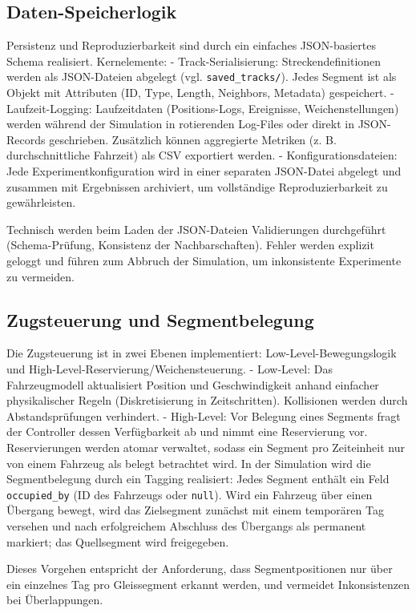\subsection*{Daten-Speicherlogik}
Persistenz und Reproduzierbarkeit sind durch ein einfaches JSON-basiertes Schema realisiert. Kernelemente:
- Track-Serialisierung: Streckendefinitionen werden als JSON-Dateien abgelegt (vgl. \texttt{saved\_tracks/}). Jedes Segment ist als Objekt mit Attributen (ID, Type, Length, Neighbors, Metadata) gespeichert.
- Laufzeit-Logging: Laufzeitdaten (Positions-Logs, Ereignisse, Weichenstellungen) werden während der Simulation in rotierenden Log-Files oder direkt in JSON-Records geschrieben. Zusätzlich können aggregierte Metriken (z. B. durchschnittliche Fahrzeit) als CSV exportiert werden.
- Konfigurationsdateien: Jede Experimentkonfiguration wird in einer separaten JSON-Datei abgelegt und zusammen mit Ergebnissen archiviert, um vollständige Reproduzierbarkeit zu gewährleisten.

Technisch werden beim Laden der JSON-Dateien Validierungen durchgeführt (Schema-Prüfung, Konsistenz der Nachbarschaften). Fehler werden explizit geloggt und führen zum Abbruch der Simulation, um inkonsistente Experimente zu vermeiden.

\subsection*{Zugsteuerung und Segmentbelegung}
Die Zugsteuerung ist in zwei Ebenen implementiert: Low-Level-Bewegungslogik und High-Level-Reservierung/Weichensteuerung.
- Low-Level: Das Fahrzeugmodell aktualisiert Position und Geschwindigkeit anhand einfacher physikalischer Regeln (Diskretisierung in Zeitschritten). Kollisionen werden durch Abstandsprüfungen verhindert.
- High-Level: Vor Belegung eines Segments fragt der Controller dessen Verfügbarkeit ab und nimmt eine Reservierung vor. Reservierungen werden atomar verwaltet, sodass ein Segment pro Zeiteinheit nur von einem Fahrzeug als belegt betrachtet wird. In der Simulation wird die Segmentbelegung durch ein Tagging realisiert: Jedes Segment enthält ein Feld \texttt{occupied\_by} (ID des Fahrzeugs oder \texttt{null}). Wird ein Fahrzeug über einen Übergang bewegt, wird das Zielsegment zunächst mit einem temporären Tag versehen und nach erfolgreichem Abschluss des Übergangs als permanent markiert; das Quellsegment wird freigegeben.

Dieses Vorgehen entspricht der Anforderung, dass Segmentpositionen nur über ein einzelnes Tag pro Gleissegment erkannt werden, und vermeidet Inkonsistenzen bei Überlappungen.

